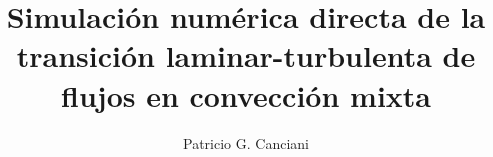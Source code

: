 \documentclass[12pt,screen,twoside]{ibtesis}
\title{Simulación numérica directa de la transición laminar-turbulenta de flujos en convección mixta}
\author{Patricio G. Canciani}
\begin{document}

\begin{preliminary}



%
%
%
%
%
%

\begin{abreviaturas}
\begin{itemize}
\small{ \small{

}}
\end{itemize}
\end{abreviaturas}
\end{preliminary}
\end{document}
